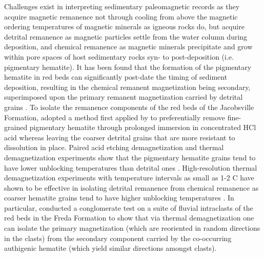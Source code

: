 \documentclass[draft]{agujournal2019}
\begin{document}
Challenges exist in interpreting sedimentary paleomagnetic records as they acquire magnetic remanence not through cooling from above the magnetic ordering temperatures of magnetic minerals as igneous rocks do, but acquire detrital remanence as magnetic particles settle from the water column during deposition, and chemical remanence as magnetic minerals precipitate and grow within pore spaces of host sedimentary rocks syn- to post-deposition (i.e. pigmentary hematite). It has been found that the formation of the pigmentary hematite in red beds can significantly post-date the timing of sediment deposition, resulting in the chemical remanent magnetization being secondary, superimposed upon the primary remanent magnetization carried by detrital grains \cite{Butler1992a}. To isolate the remanence components of the red beds of the Jacobsville Formation,  adopted a method first applied by  to preferentially remove fine-grained pigmentary hematite through prolonged immersion in concentrated HCl acid whereas leaving the coarser detrital grains that are more resistant to dissolution in place. Paired acid etching demagnetization and thermal demagnetization experiments show that the pigmentary hematite grains tend to have lower unblocking temperatures than detrital ones \cite{Bilardello2010a, Tauxe1980a}. High-resolution thermal demagnetization experiments with temperature intervals as small as 1-2 \textdegree C have shown to be effective in isolating detrital remanence from chemical remanence as coarser hematite grains tend to have higher unblocking temperatures \cite{Swanson-Hysell2019b}. In particular, \cite{Swanson-Hysell2019b} conducted a conglomerate test on a suite of fluvial intraclasts of the red beds in the Freda Formation to show that via thermal demagnetization one can isolate the primary magnetization (which are reoriented in random directions in the clasts) from the secondary component carried by the co-occurring authigenic hematite (which yield similar directions amongst clasts). 
\end{document}
